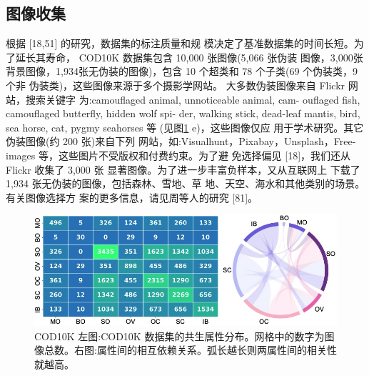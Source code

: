 \documentclass[final]{cvpr}
\renewcommand{\figref}[1]{图\ref{#1}}
\begin{document}
\subsection{图像收集}
根据 [18,51] 的研究，数据集的标注质量和规 模决定了基准数据集的时间长短。为了延长其寿命， COD10K 数据集包含 10,000 张图像(5,066 张伪装 图像，3,000张背景图像，1,934张无伪装的图像)，包含 10 个超类和 78 个子类(69 个伪装类，9 个非 伪装类)，这些图像来源于多个摄影学网站。
大多数伪装图像来自 Flickr 网站，搜索关键字 为:camouflaged animal, unnoticeable animal, cam- ouflaged fish, camouflaged butterfly, hidden wolf spi- der, walking stick, dead-leaf mantis, bird, sea horse, cat, pygmy seahorses 等 (见\figref{fig:Catagory_COD10k} e)，这些图像仅应 用于学术研究。其它伪装图像(约 200 张)来自下列 网站，如:Visualhunt，Pixabay，Unsplash，Free- images 等，这些图片不受版权和付费约束。为了避 免选择偏见 [18]，我们还从 Flickr 收集了 3,000 张 显著图像。为了进一步丰富负样本，又从互联网上 下载了 1,934 张无伪装的图像，包括森林、雪地、草 地、天空、海水和其他类别的场景。有关图像选择方 案的更多信息，请见周等人的研究 [81]。

\begin{figure}[tp]
    \centering
    \includegraphics[width=0.98\columnwidth]{COD_Zh_translate/figures/Inter_relation_COD10k.png}\small
    \caption{COD10K 左图:COD10K 数据集的共生属性分布。网格中的数字为图像总数。右图:属性间的相互依赖关系。弧长越长则两属性间的相关性就越高。}
    \label{fig:Catagory_COD10k}
\end{figure}
\end{document}
